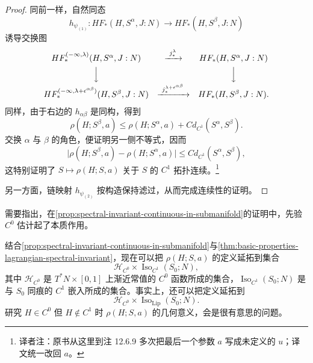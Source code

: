 \begin{proof}
同前一样，自然同态
\[
  h_{\psi_{(1)}}:
  HF_*(H,S^\alpha,J:N)
  \longrightarrow HF_*(H,S^\beta,J:N)
\]
诱导交换图
\[
\begin{array}{ccc}
  HF_*^{(-\infty,\lambda)}(H,S^\alpha,J:N)
  &\xrightarrow{\ j_*^\lambda\ }&
  HF_*(H,S^\alpha,J:N)\\[4pt]
  \Big\downarrow && \Big\downarrow\\[4pt]
  HF_*^{(-\infty,\lambda+\epsilon^{\alpha\beta})}(H,S^\beta,J:N)
  &\xrightarrow{\ j_*^{\lambda+\epsilon^{\alpha\beta}}\ }&
  HF_*(H,S^\beta,J:N).
\end{array}
\]
同样，由于右边的 $h_{\alpha\beta}$ 是同构，得到
\[
  \rho(H;S^\beta,a)
  \le\rho(H;S^\alpha,a)+C d_{C^1}(S^\alpha,S^\beta).
\]
交换 $\alpha$ 与 $\beta$ 的角色，便证明另一侧不等式，因而
\begin{equation}
  \bigl\lvert\rho(H;S^\beta,a)-\rho(H;S^\alpha,a)\bigr\rvert
  \le C d_{C^1}(S^\alpha,S^\beta),
\label{eq:spectral-invariant-lipschitz-submanifold}
\end{equation}
这特别证明了 $S\longmapsto\rho(H;S,a)$ 关于 $S$ 的 $C^1$ 拓扑连续。\footnote{译者注：原书从这里到注 12.6.9 多次把最后一个参数 $a$ 写成未定义的 $u$；译文统一改回 $a$。}

另一方面，链映射 $h_{\psi_{(2)}}$ 按构造保持滤过，从而完成连续性的证明。
\end{proof}

需要指出，在\cref{prop:spectral-invariant-continuous-in-submanifold}的证明中，先验 $C^0$ 估计起了本质作用。

\begin{remark}
\label{rem:spectral-invariant-c0-lipschitz-extension}
结合\cref{prop:spectral-invariant-continuous-in-submanifold}与\cref{thm:basic-properties-lagrangian-spectral-invariant}，现在可以把 $\rho(H;S,a)$ 的定义延拓到集合
\[
  \mathcal H_{C^0}\times\operatorname{Iso}_{C^1}(S_0;N),
\]
其中 $\mathcal H_{C^0}$ 是 $T^*N\times[0,1]$ 上渐近常值的 $C^0$ 函数所成的集合，$\operatorname{Iso}_{C^1}(S_0;N)$ 是与 $S_0$ 同痕的 $C^1$ 嵌入所成的集合。事实上，还可以把定义延拓到
\[
  \mathcal H_{C^0}\times\operatorname{Iso}_{\mathrm{Lip}}(S_0;N).
\]
研究 $H\in C^0$ 但 $H\notin C^1$ 时 $\rho(H;S,a)$ 的几何意义，会是很有意思的问题。
\end{remark}

